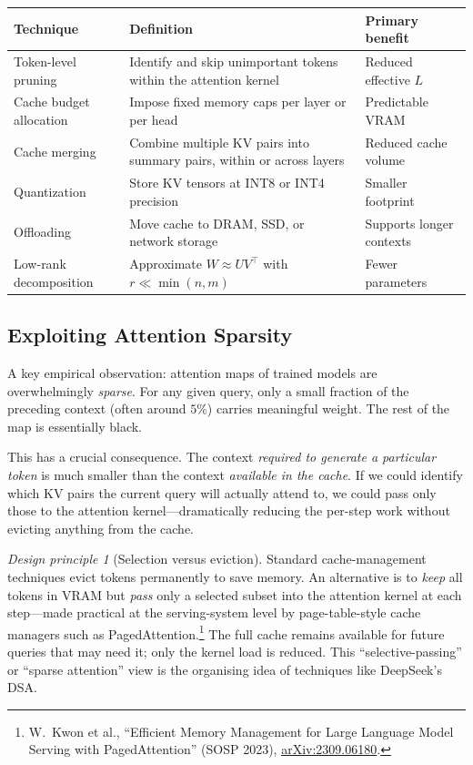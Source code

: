 \documentclass[11pt,a4paper]{article}
\theoremstyle{definition}
\theoremstyle{remark}
\newtheorem*{principle}{Design principle}
\theoremstyle{plain}
\newcommand{\arxivlink}[1]{\href{https://arxiv.org/abs/#1}{arXiv:#1}}
\begin{document}
\begin{center}
\renewcommand{\arraystretch}{1.25}
\begin{tabular}{@{}p{} p{} p{}@{}}
\toprule
\textbf{Technique} & \textbf{Definition} & \textbf{Primary benefit} \\
\midrule
Token-level pruning        & Identify and skip unimportant tokens within the attention kernel & Reduced effective $L$ \\
Cache budget allocation    & Impose fixed memory caps per layer or per head & Predictable VRAM \\
Cache merging              & Combine multiple KV pairs into summary pairs, within or across layers & Reduced cache volume \\
Quantization               & Store KV tensors at INT8 or INT4 precision & Smaller footprint \\
Offloading                 & Move cache to DRAM, SSD, or network storage & Supports longer contexts \\
Low-rank decomposition     & Approximate $W \approx UV^\top$ with $r \ll \min(n,m)$ & Fewer parameters \\
\bottomrule
\end{tabular}
\end{center}

\subsection{Exploiting Attention Sparsity}

A key empirical observation: attention maps of trained models are
overwhelmingly \emph{sparse}. For any given query, only a small fraction
of the preceding context (often around $5\%$) carries meaningful weight.
The rest of the map is essentially black.

This has a crucial consequence. The context \emph{required to generate a
particular token} is much smaller than the context \emph{available in the
cache}. If we could identify which KV pairs the current query will
actually attend to, we could pass only those to the attention
kernel---dramatically reducing the per-step work without evicting anything
from the cache.

\begin{principle}[Selection versus eviction]
Standard cache-management techniques evict tokens permanently to save
memory. An alternative is to \emph{keep} all tokens in VRAM but \emph{pass}
only a selected subset into the attention kernel at each step---made
practical at the serving-system level by page-table-style cache managers
such as PagedAttention.\footnote{W.\ Kwon et al., ``Efficient Memory
Management for Large Language Model Serving with PagedAttention'' (SOSP
2023), \arxivlink{2309.06180}.} The full cache remains available for future
queries that may need it; only the kernel load is reduced. This
``selective-passing'' or ``sparse attention'' view is the organising idea
of techniques like DeepSeek's DSA.
\end{principle}
\end{document}
